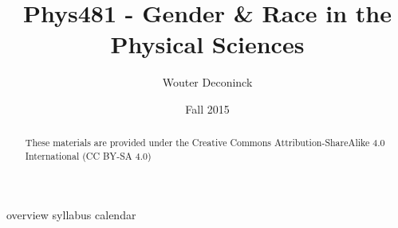 \documentclass{article}
\title{Phys481 - Gender \& Race in the Physical Sciences}
\author{Wouter Deconinck}
\date{Fall 2015}
\begin{document}
\maketitle

\begin{abstract}
These materials are provided under the Creative Commons Attribution-ShareAlike 4.0 International (CC BY-SA 4.0)
\end{abstract}

{overview}
{syllabus}
{calendar}
\end{document}
